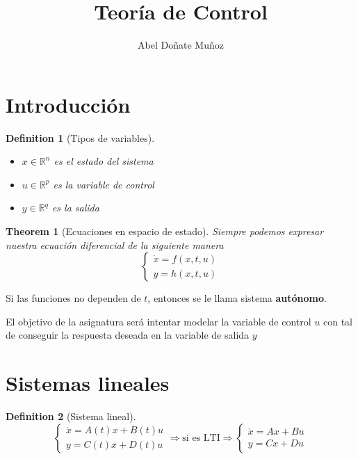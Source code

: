 \documentclass[leqno]{article}
\title{Teoría de Control}
\author{Abel Doñate Muñoz}
\date{}
\newtheorem*{theorem}{Theorem}
\newtheorem*{definition}{Definition}
\begin{document}
\maketitle
\tableofcontents
\newpage

\section{Introducción}

\begin{definition}[Tipos de variables] \
\begin{itemize}[topsep=-6pt, itemsep=0pt]
  \item $x \in \mathbb{R}^n$ es el estado del sistema 
  \item $u \in \mathbb{R}^p$ es la variable de control
  \item $y\in \mathbb{R}^q$ es la salida
\end{itemize}
\end{definition}

\begin{theorem}[Ecuaciones en espacio de estado]
Siempre podemos expresar nuestra ecuación diferencial de la siguiente manera
\[
  \begin{cases}
\dot{x} = f(x, t, u) \\ y = h(x, t, u)
  \end{cases}
\] 
\end{theorem}

Si las funciones no dependen de $t$, entonces se le llama sistema \textbf{autónomo}.


El objetivo de la asignatura será intentar modelar la variable de control $u$ con tal de conseguir la respuesta deseada en la variable de salida $y$


\section{Sistemas lineales}
\begin{definition}[Sistema lineal]
\[
\begin{cases}
  \dot{x}=A(t)x + B(t)u \\ y = C(t)x + D(t)u
\end{cases} \Rightarrow \text{si es LTI} \Rightarrow
\begin{cases}
  \dot{x}=Ax + Bu \\ y = Cx + Du
\end{cases}
\] 
\end{definition}
\end{document}
